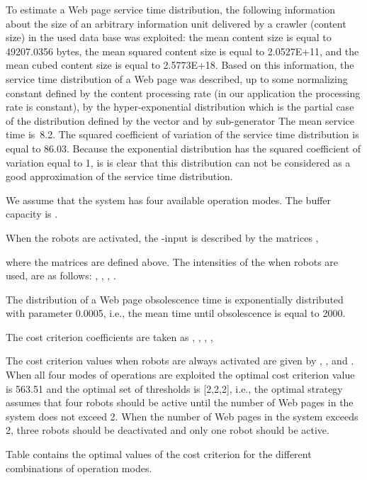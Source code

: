 \documentclass[11pt]{article}
\begin{document}
To estimate a Web page service time distribution, the following
information  about the size of an arbitrary information unit
delivered by a crawler (content size) in the used data base was
exploited: the mean content size is equal to 49207.0356 bytes, the
mean squared content size is equal to 2.0527E+11, and the mean cubed
content size is equal to   2.5773E+18. Based on this information,
the service time distribution of a Web page was described, up to
some normalizing constant defined by the content processing rate
(in our application the processing rate is constant), 
by the hyper-exponential distribution which is the partial case of the
 distribution defined by the vector  and by sub-generator
 The mean service
time is~8.2. The squared coefficient of variation of the service
time distribution is equal to 86.03. Because the exponential
distribution has the squared coefficient of variation equal to 1, is
is clear that this distribution can not be considered as a good
approximation of the service time distribution.

We assume that the system has four available operation modes. The
buffer capacity is .

When the  robots are activated, the -input is described by
the matrices ,

where the matrices  are defined above.
The intensities  of the  when  robots are
used,  are as follows: ,
, ,
.

The distribution of a Web page obsolescence time is exponentially
distributed with parameter 0.0005, i.e., the mean time until
obsolescence is equal to 2000.

The cost criterion coefficients are taken as ,
, , , 

The cost criterion values   when  
robots are always activated are given by , ,
 and . When all four modes of operations are
exploited the optimal cost criterion value is 563.51 and the optimal
set of thresholds is [2,2,2], i.e., the optimal strategy assumes
that four robots should be active until the number of Web pages in
the system does not exceed 2. When the number of Web pages in the
system  exceeds 2, three robots should be deactivated and only one
robot should be active.

Table  contains the optimal values of the cost criterion for the
different combinations of operation modes.
\end{document}
